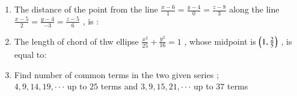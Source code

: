 \documentclass[journal,12pt,onecolumn]{IEEEtran}
\theoremstyle{remark}
\begin{document}
\begin{enumerate}
\begin{enumerate}
\end{enumerate}
\item The distance of the point  from the line $ \frac{x-6}{1}=\frac{y-4}{0}=\frac{z-8}{3} $ along the line $ \frac{x-5}{2}=\frac{y-4}{-3}=\frac{z-5}{6} $ , is : \\
\begin{enumerate}   
\end{enumerate}
\item The length of chord of thw ellipse $ \frac{x^2}{25} + \frac{y^2}{16} = 1 $ , whose midpoint is $ \left(1,\frac{2}{5}\right) $ , is equal to: 
\begin{enumerate}
\end{enumerate}
\item Find number of common terms in the two given series ; \\ $ 4, 9, 14, 19,\cdot\cdot\cdot $ up to $ 25 $ terms and $ 3, 9, 15, 21,\cdot\cdot\cdot $ up to $ 37 $ terms \\
\begin{enumerate}
\end{enumerate}

\end{enumerate}
\end{document}

